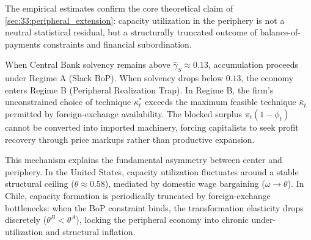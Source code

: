 The empirical estimates confirm the core theoretical claim of \cref{sec:33:peripheral_extension}: capacity utilization in the periphery is not a neutral statistical residual, but a structurally truncated outcome of balance-of-payments constraints and financial subordination.

When Central Bank solvency remains above $\hat{\gamma}_S \approx 0.13$, accumulation proceeds under Regime A (Slack BoP). When solvency drops below $0.13$, the economy enters Regime B (Peripheral Realization Trap). In Regime B, the firm's unconstrained choice of technique $\kappa^*_t$ exceeds the maximum feasible technique $\bar{\kappa}_t$ permitted by foreign-exchange availability. The blocked surplus $\pi_t (1 - \phi_t)$ cannot be converted into imported machinery, forcing capitalists to seek profit recovery through price markups rather than productive expansion.

This mechanism explains the fundamental asymmetry between center and periphery. In the United States, capacity utilization fluctuates around a stable structural ceiling ($\theta \approx 0.58$), mediated by domestic wage bargaining ($\omega \rightarrow \theta$). In Chile, capacity formation is periodically truncated by foreign-exchange bottlenecks: when the BoP constraint binds, the transformation elasticity drops discretely ($\theta^B < \theta^A$), locking the peripheral economy into chronic under-utilization and structural inflation.
